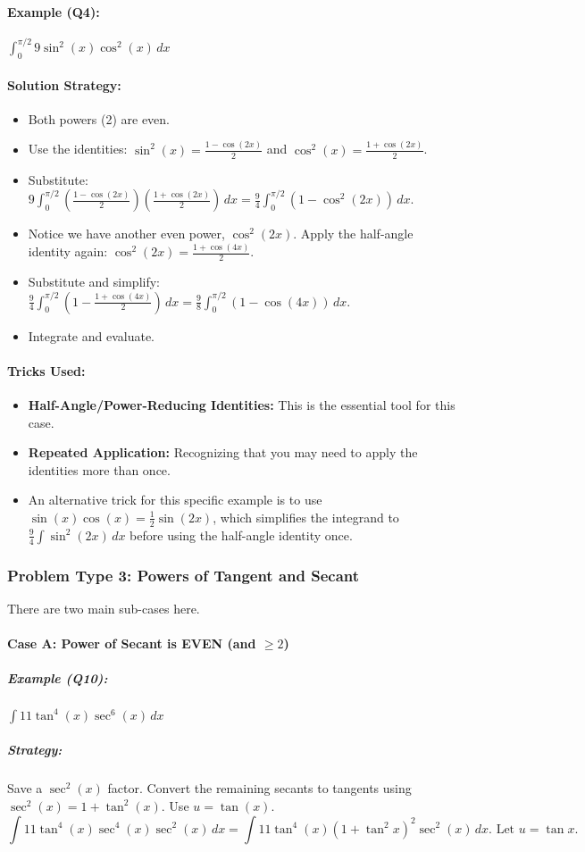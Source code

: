 \documentclass{article}
\begin{document}
\paragraph{Example (Q4):} $ \int_0^{\pi/2} 9\sin^2(x)\cos^2(x) \,dx $
\paragraph{Solution Strategy:}
\begin{itemize}
    \item Both powers (2) are even.
    \item Use the identities: $\sin^2(x) = \frac{1-\cos(2x)}{2}$ and $\cos^2(x) = \frac{1+\cos(2x)}{2}$.
    \item Substitute: $9 \int_0^{\pi/2} (\frac{1-\cos(2x)}{2})(\frac{1+\cos(2x)}{2}) \,dx = \frac{9}{4} \int_0^{\pi/2} (1-\cos^2(2x)) \,dx$.
    \item Notice we have another even power, $\cos^2(2x)$. Apply the half-angle identity again: $\cos^2(2x) = \frac{1+\cos(4x)}{2}$.
    \item Substitute and simplify: $\frac{9}{4} \int_0^{\pi/2} (1 - \frac{1+\cos(4x)}{2}) \,dx = \frac{9}{8} \int_0^{\pi/2} (1-\cos(4x)) \,dx$.
    \item Integrate and evaluate.
\end{itemize}
\paragraph{Tricks Used:}
\begin{itemize}
    \item \textbf{Half-Angle/Power-Reducing Identities:} This is the essential tool for this case.
    \item \textbf{Repeated Application:} Recognizing that you may need to apply the identities more than once.
    \item An alternative trick for this specific example is to use $\sin(x)\cos(x) = \frac{1}{2}\sin(2x)$, which simplifies the integrand to $\frac{9}{4}\int \sin^2(2x) \,dx$ before using the half-angle identity once.
\end{itemize}

\subsubsection{Problem Type 3: Powers of Tangent and Secant}
There are two main sub-cases here.
\paragraph{Case A: Power of Secant is EVEN (and $\ge 2$)}
\subparagraph{Example (Q10):} $ \int 11\tan^4(x)\sec^6(x) \,dx $
\subparagraph{Strategy:} Save a $\sec^2(x)$ factor. Convert the remaining secants to tangents using $\sec^2(x) = 1+\tan^2(x)$. Use $u=\tan(x)$.
\[ \int 11\tan^4(x)\sec^4(x)\sec^2(x) \,dx = \int 11\tan^4(x)(1+\tan^2x)^2\sec^2(x) \,dx. \text{ Let } u=\tan x. \]
\end{document}
